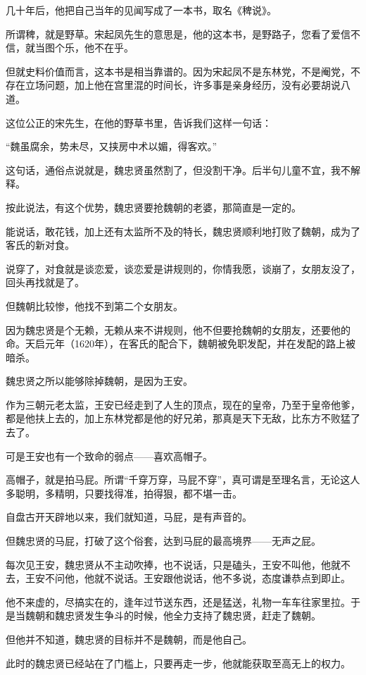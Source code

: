 \begin{multicols}{\theparacolNo}
		几十年后，他把自己当年的见闻写成了一本书，取名《稗说》。

		所谓稗，就是野草。宋起凤先生的意思是，他的这本书，是野路子，您看了爱信不信，就当图个乐，他不在乎。

		但就史料价值而言，这本书是相当靠谱的。因为宋起凤不是东林党，不是阉党，不存在立场问题，加上他在宫里混的时间长，许多事是亲身经历，没有必要胡说八道。

		这位公正的宋先生，在他的野草书里，告诉我们这样一句话：

		“魏虽腐余，势未尽，又挟房中术以媚，得客欢。”

		这句话，通俗点说就是，魏忠贤虽然割了，但没割干净。后半句儿童不宜，我不解释。

		按此说法，有这个优势，魏忠贤要抢魏朝的老婆，那简直是一定的。

		能说话，敢花钱，加上还有太监所不及的特长，魏忠贤顺利地打败了魏朝，成为了客氏的新对食。

		说穿了，对食就是谈恋爱，谈恋爱是讲规则的，你情我愿，谈崩了，女朋友没了，回头再找就是了。

		但魏朝比较惨，他找不到第二个女朋友。

		因为魏忠贤是个无赖，无赖从来不讲规则，他不但要抢魏朝的女朋友，还要他的命。天启元年（1620年），在客氏的配合下，魏朝被免职发配，并在发配的路上被暗杀。

		魏忠贤之所以能够除掉魏朝，是因为王安。

		作为三朝元老太监，王安已经走到了人生的顶点，现在的皇帝，乃至于皇帝他爹，都是他扶上去的，加上东林党都是他的好兄弟，那真是天下无敌，比东方不败猛了去了。

		可是王安也有一个致命的弱点——喜欢高帽子。

		高帽子，就是拍马屁。所谓“千穿万穿，马屁不穿”，真可谓是至理名言，无论这人多聪明，多精明，只要找得准，拍得狠，都不堪一击。

		自盘古开天辟地以来，我们就知道，马屁，是有声音的。

		但魏忠贤的马屁，打破了这个俗套，达到马屁的最高境界——无声之屁。

		每次见王安，魏忠贤从不主动吹捧，也不说话，只是磕头，王安不叫他，他就不去，王安不问他，他就不说话。王安跟他说话，他不多说，态度谦恭点到即止。

		他不来虚的，尽搞实在的，逢年过节送东西，还是猛送，礼物一车车往家里拉。于是当魏朝和魏忠贤发生争斗的时候，他全力支持了魏忠贤，赶走了魏朝。

		但他并不知道，魏忠贤的目标并不是魏朝，而是他自己。

		此时的魏忠贤已经站在了门槛上，只要再走一步，他就能获取至高无上的权力。


\end{multicols}
